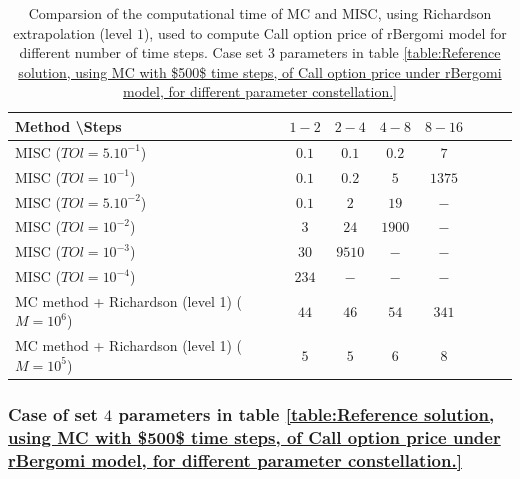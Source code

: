 \documentclass[11pt]{article}
\begin{document}
\begin{table}[h!]
	\centering
	\begin{tabular}{l*{6}{c}r}
		Method \textbackslash  Steps            & $1-2$ & $2-4$ & $4-8$ & $8-16$ &   \\
		\hline
		MISC ($TOl=5.10^{-1}$)  & $0.1$ & $0.1$ & $0.2$ & $7$  \\
		MISC ($TOl=10^{-1}$)  & $0.1$ & $0.2$ & $5$ & $1375$  \\
		MISC ($TOl=5.10^{-2}$)  & $0.1$ & $2$ & $19$ & $-$  \\
		MISC ($TOl=10^{-2}$)  & $3$ & $24$ & $1900$ & $-$  \\	
		MISC ($TOl=10^{-3}$)  & $30$ & $9510$ & $-$ & $-$  \\	
		MISC ($TOl=10^{-4}$)  & $234$ & $-$ & $-$ & $-$  \\	
		\hline
		MC method + Richardson (level 1) ($M=10^{6}$)  &$44$ & $46$  & $54$  & $341$ \\	
		MC method + Richardson (level 1) ($M=10^{5}$)  &$5$ & $5$  & $6$  & $8$ \\
		\hline
	\end{tabular}
	\caption{Comparsion of the computational time of  MC and MISC, using Richardson extrapolation (level $1$), used to compute Call option price of rBergomi model for different number of time steps. Case set $3$ parameters in table \ref{table:Reference solution, using MC with $500$ time steps, of Call option price under rBergomi model, for different parameter constellation.}}
	\label{Comparsion of the computational time of  MC and MISC, using Richardson extrapolation (level $1$), used to compute Call option price of rBergomi model for different number of time steps. Case set $3$ parameters}
\end{table}

\FloatBarrier

\subsubsection{Case of set $4$ parameters in table \ref{table:Reference solution, using MC with $500$ time steps, of Call option price under rBergomi model, for different parameter constellation.}}\label{sec:Case of set 4 parameters}
\end{document}
